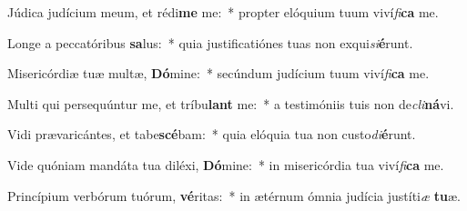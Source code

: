 \item Júdica judícium meum, et rédi\textbf{me} me:~* propter elóquium tuum viví\textit{fi}\textbf{ca} me.
\item Longe a peccatóribus \textbf{sa}lus:~* quia justificatiónes tuas non exqui\textit{si}\textbf{é}runt.
\item Misericórdiæ tuæ multæ, \textbf{Dó}mine:~* secúndum judícium tuum viví\textit{fi}\textbf{ca} me.
\item Multi qui persequúntur me, et tríbu\textbf{lant} me:~* a testimóniis tuis non de\textit{cli}\textbf{ná}vi.
\item Vidi prævaricántes, et tabe\textbf{scé}bam:~* quia elóquia tua non custo\textit{di}\textbf{é}runt.
\item Vide quóniam mandáta tua diléxi, \textbf{Dó}mine:~* in misericórdia tua viví\textit{fi}\textbf{ca} me.
\item Princípium verbórum tuórum, \textbf{vé}ritas:~* in ætérnum ómnia judícia justíti\textit{æ} \textbf{tu}æ.
